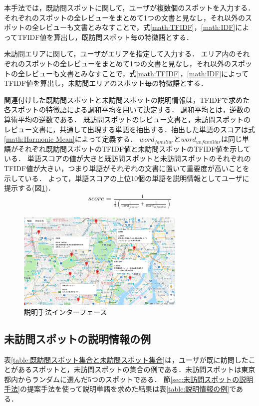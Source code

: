\documentclass{deimj}
\begin{document}
本手法では，既訪問スポットに関して，ユーザが複数個のスポットを入力する．
それぞれのスポットの全レビューをまとめて1つの文書と見なし，それ以外のスポットの全レビューも文書とみなすことで，式\ref{math:TFIDF}，\ref{math:IDF}によってTFIDF値を算出し，既訪問スポット毎の特徴語とする．

未訪問エリアに関して，ユーザがエリアを指定して入力する．
エリア内のそれぞれのスポットの全レビューをまとめて1つの文書と見なし，それ以外のスポットの全レビューも文書とみなすことで，式\ref{math:TFIDF}，\ref{math:IDF}によってTFIDF値を算出し，未訪問エリアのスポット毎の特徴語とする．

関連付けした既訪問スポットと未訪問スポットの説明情報は，TFIDFで求めた各スポットの特徴語による調和平均を用いて決定する．
調和平均とは，逆数の算術平均の逆数である．
既訪問スポットのレビュー文書と，未訪問スポットのレビュー文書に，共通して出現する単語を抽出する．抽出した単語のスコアは式\ref{math:Harmonic Mean}によって定義する．
$word_{familiar}$と$word_{unfamiliar}$は同じ単語がそれぞれ既訪問スポットのTFIDF値と未訪問スポットのTFIDF値を示している．
単語スコアの値が大きと既訪問スポットと未訪問スポットのそれぞれのTFIDF値が大きい，つまり単語がそれぞれの文書に置いて重要度が高いことを示している．
よって，単語スコアの上位10個の単語を説明情報としてユーザに提示する(図\ref{fig:photo_map})．
\begin{eqnarray}
  score=\frac{1}{\frac{1}{2}(\frac{1}{word_{familiar}}+\frac{1}{word_{unfamiliar}})}
  \label{math:Harmonic Mean}
\end{eqnarray}

\begin{figure}[t]
  \begin{center}
    \includegraphics[clip,width=8.0cm]{picture/Photo_Map.png}
    \caption{説明手法インターフェース}
    \label{fig:photo_map}
   \end{center}
\end{figure}

\subsection{未訪問スポットの説明情報の例}
\label{subsec:未訪問スポットの説明情報の例}
表\ref{table:既訪問スポット集合と未訪問スポット集合}は，ユーザが既に訪問したことがあるスポットと，未訪問スポットの集合の例である．未訪問スポットは東京都内からランダムに選んだ5つのスポットである．
節\ref{sec:未訪問スポットの説明手法}の提案手法を使って説明単語を求めた結果は表\ref{table:説明情報の例}である．
\end{document}
